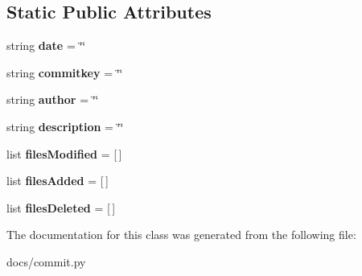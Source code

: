 \subsection*{Static Public Attributes}
\begin{DoxyCompactItemize}
\item 
\mbox{\label{classcommit_1_1Commit_ae17bc2a19f57e86ec9f97edbf5c6d92a}} 
string {\bfseries date} = \char`\"{}\char`\"{}
\item 
\mbox{\label{classcommit_1_1Commit_ad8266d0f52ea558bbebabe402789c392}} 
string {\bfseries commitkey} = \char`\"{}\char`\"{}
\item 
\mbox{\label{classcommit_1_1Commit_a81ea77c430dc4e1de39cf79bc85aea7e}} 
string {\bfseries author} = \char`\"{}\char`\"{}
\item 
\mbox{\label{classcommit_1_1Commit_a4eaa38c5a4d1ebfa4d4432a2e6879a12}} 
string {\bfseries description} = \char`\"{}\char`\"{}
\item 
\mbox{\label{classcommit_1_1Commit_a7c444414ae1a22d4a93bbcb24f962c82}} 
list {\bfseries files\+Modified} = \mbox{[}$\,$\mbox{]}
\item 
\mbox{\label{classcommit_1_1Commit_aea356b83c751276561f5fd383d7ec7fd}} 
list {\bfseries files\+Added} = \mbox{[}$\,$\mbox{]}
\item 
\mbox{\label{classcommit_1_1Commit_af8bf87dd7695ca9a3a7567da542073a5}} 
list {\bfseries files\+Deleted} = \mbox{[}$\,$\mbox{]}
\end{DoxyCompactItemize}


The documentation for this class was generated from the following file\+:\begin{DoxyCompactItemize}
\item 
docs/commit.\+py\end{DoxyCompactItemize}
